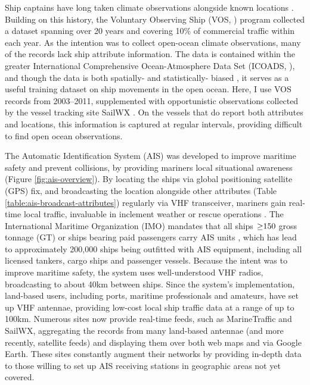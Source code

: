 \documentclass[12pt,letterpaper]{article}
\begin{document}
Ship captains have long taken climate observations alongside known locations \citep{brohan2009marine}.  Building on this history, the Voluntary Observing Ship (VOS, \citealp{VOSOverview}) program collected a dataset spanning over 20 years and covering 10\% of commercial traffic within each year. As the intention was to collect open-ocean climate observations, many of the records lack ship attribute information. %
The data is contained within the greater International Comprehensive Ocean-Atmosphere Data Set (ICOADS, \citealp{woodruff2010icoads}), and though the data is both spatially- and statistically- biased \citep{Wang2007}, it serves as a useful training dataset on ship movements in the open ocean. Here, I use VOS records from 2003--2011, supplemented with opportunistic observations collected by the vessel tracking site SailWX \citep{SAILWX}. On the vessels that do report both attributes and locations, this information is captured at regular intervals, providing difficult to find open ocean observations.

The Automatic Identification System (AIS) \citep{no20041028,Tetreault2002} was developed to improve maritime safety and prevent collisions, by providing mariners local situational awareness (Figure \ref{fig:ais-overview}). By locating the ships via global positioning satellite (GPS) fix, and broadcasting the location alongside other attributes (Table \ref{table:ais-broadcast-attributes}) regularly via VHF transceiver, mariners gain real-time local traffic, invaluable in inclement weather or rescue operations \citep{Itu-r2010}.  The International Maritime Organization (IMO) mandates that all ships $\geq\negthickspace 150$ gross tonnage (GT) or ships bearing paid passengers carry AIS units \citep{solas}, which has lead to approximately 200,000 ships being outfitted with AIS equipment, including all licensed tankers, cargo ships and passenger vessels. Because the intent was to improve maritime safety, the system uses well-understood VHF radios, broadcasting to about 40km between ships. Since the system's implementation, land-based users, including ports, maritime professionals and amateurs, have set up VHF antennae, providing low-cost local ship traffic data at a range of up to 100km. Numerous sites now provide real-time feeds, such as MarineTraffic \citep{MarineTraffic} and SailWX, aggregating the records from many land-based antennae (and more recently, satellite feeds) and displaying them over both web maps and via Google Earth. These sites constantly augment their networks by providing in-depth data to those willing to set up AIS receiving stations in geographic areas not yet covered.
\end{document}
